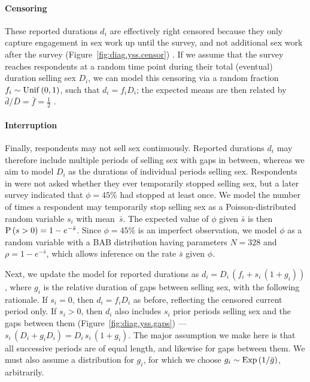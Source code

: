 \paragraph{Censoring}
These reported durations $d_i$ are effectively right censored
because they only capture engagement in sex work up until the survey,
and not additional sex work after the survey
(Figure~\ref{fig:diag.yss.censor}) \cite{Fazito2012}.
If we assume that the survey reaches respondents at a random time point
during their total (eventual) duration selling sex $D_i$, we can model this censoring via
a random fraction $f_i \sim \mathrm{Unif}\,(0,1)$, such that $d_i = f_i D_i$;
the expected means are then related by $\bar{d} / \bar{D} = \bar{f} = \frac12$ \cite{Tufto2017}.
\paragraph{Interruption}
Finally, respondents may not sell sex continuously.
Reported durations $d_i$ may therefore include
multiple periods of selling sex with gaps in between,
whereas we aim to model $D_i$ as the durations of individual periods selling sex.
Respondents in \cite{Baral2014} were not asked whether they ever temporarily stopped selling sex,
but a later survey \cite{EswKP2014} indicated that $\phi = 45\%$ had stopped at least once.
We model the number of times a respondent may temporarily stop selling sex as
a Poisson-distributed random variable $s_i$ with mean~$\bar{s}$.
The expected value of $\phi$ given $\bar{s}$ is then $\mathrm{P}\,(s > 0) = 1 - e^{-\bar{s}}$.
Since $\phi = 45\%$ is an imperfect observation,
we model $\phi$ as a random variable with a BAB distribution
having parameters $N = 328$ and $\rho = 1 - e^{-\bar{s}}$,
which allows inference on the rate $\bar{s}$ given $\phi$.
\par
Next, we update the model for reported durations as $d_i = D_i\,(f_i + s_i\,(1 + g_i))$,
where $g_i$ is the relative duration of gaps between selling sex,
with the following rationale.
If $s_i = 0$, then $d_i = f_i D_i$ as before, reflecting the censored current period only.
If $s_i > 0$, then $d_i$ also includes $s_i$ prior periods selling sex and the gaps between them
(Figure~\ref{fig:diag.yss.gaps}) --- \ie $s_i\,(D_i + g_i D_i) = D_i\,s_i\,(1 + g_i)$.
The major assumption we make here is that
all successive periods are of equal length, and likewise for gaps between them.
We must also assume a distribution for $g_i$, for which we choose
$g_i \sim \mathrm{Exp}\,(1/\bar{g})$, arbitrarily.
